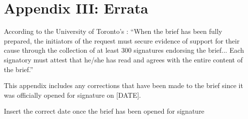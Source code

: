 

		\singlespacing
		\section{Appendix III: Errata}
		\label{sec:Errata}
		\doublespacing



According to the University of Toronto's : ``When the brief has been fully prepared, the initiators of the request must secure evidence of support for their cause through the collection of at least 300 signatures endorsing the brief... Each signatory must attest that he/she has read and agrees with the entire content of the brief.''



This appendix includes any corrections that have been made to the brief since it was officially opened for signature on [DATE].



\begin{vcom}
Insert the correct date once the brief has been opened for signature
\end{vcom}



